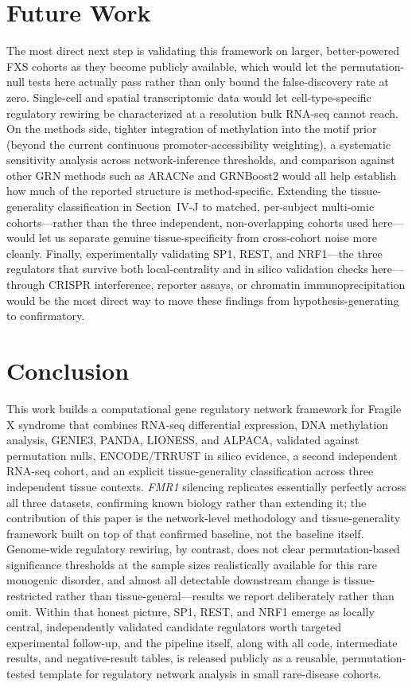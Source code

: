 \documentclass[journal]{IEEEtran}
\newcommand{\gene}[1]{\textit{#1}}
\begin{document}
\section{Future Work}
The most direct next step is validating this framework on larger, better-powered FXS cohorts as they become publicly available, which would let the permutation-null tests here actually pass rather than only bound the false-discovery rate at zero. Single-cell and spatial transcriptomic data would let cell-type-specific regulatory rewiring be characterized at a resolution bulk RNA-seq cannot reach. On the methods side, tighter integration of methylation into the motif prior (beyond the current continuous promoter-accessibility weighting), a systematic sensitivity analysis across network-inference thresholds, and comparison against other GRN methods such as ARACNe and GRNBoost2 would all help establish how much of the reported structure is method-specific. Extending the tissue-generality classification in Section~IV-J to matched, per-subject multi-omic cohorts---rather than the three independent, non-overlapping cohorts used here---would let us separate genuine tissue-specificity from cross-cohort noise more cleanly. Finally, experimentally validating SP1, REST, and NRF1---the three regulators that survive both local-centrality and in silico validation checks here---through CRISPR interference, reporter assays, or chromatin immunoprecipitation would be the most direct way to move these findings from hypothesis-generating to confirmatory.

\section{Conclusion}
This work builds a computational gene regulatory network framework for Fragile X syndrome that combines RNA-seq differential expression, DNA methylation analysis, GENIE3, PANDA, LIONESS, and ALPACA, validated against permutation nulls, ENCODE/TRRUST in silico evidence, a second independent RNA-seq cohort, and an explicit tissue-generality classification across three independent tissue contexts. \gene{FMR1} silencing replicates essentially perfectly across all three datasets, confirming known biology rather than extending it; the contribution of this paper is the network-level methodology and tissue-generality framework built on top of that confirmed baseline, not the baseline itself. Genome-wide regulatory rewiring, by contrast, does not clear permutation-based significance thresholds at the sample sizes realistically available for this rare monogenic disorder, and almost all detectable downstream change is tissue-restricted rather than tissue-general---results we report deliberately rather than omit. Within that honest picture, SP1, REST, and NRF1 emerge as locally central, independently validated candidate regulators worth targeted experimental follow-up, and the pipeline itself, along with all code, intermediate results, and negative-result tables, is released publicly as a reusable, permutation-tested template for regulatory network analysis in small rare-disease cohorts.
\end{document}
